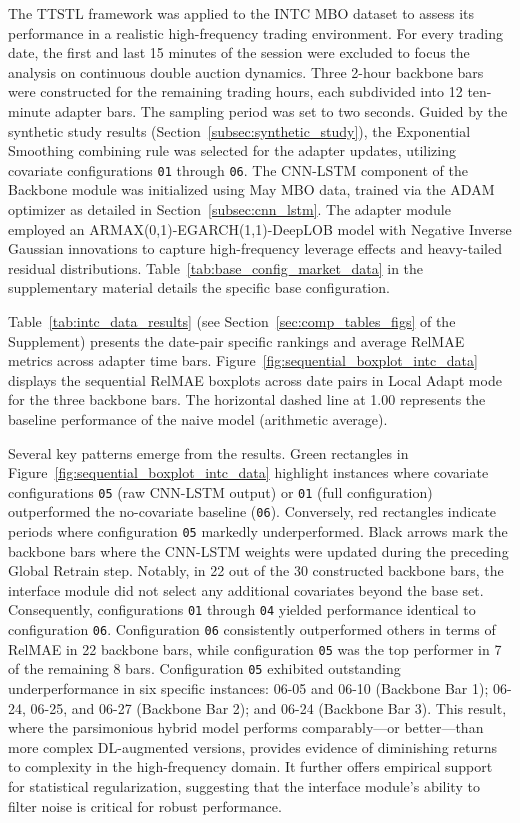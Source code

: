 \documentclass{rQUF2e}
\theoremstyle{plain}
\theoremstyle{definition}
\theoremstyle{remark}
\begin{document}
The TTSTL framework was applied to the INTC MBO dataset to assess its performance in a realistic high-frequency trading environment. For every trading date, the first and last 15 minutes of the session were excluded to focus the analysis on continuous double auction dynamics. Three 2-hour backbone bars were constructed for the remaining trading hours, each subdivided into 12 ten-minute adapter bars. The sampling period was set to two seconds. Guided by the synthetic study results (Section~\ref{subsec:synthetic_study}), the Exponential Smoothing combining rule was selected for the adapter updates, utilizing covariate configurations \texttt{01} through \texttt{06}. The CNN-LSTM component of the Backbone module was initialized using May MBO data, trained via the ADAM optimizer as detailed in Section~\ref{subsec:cnn_lstm}. The adapter module employed an ARMAX(0,1)-EGARCH(1,1)-DeepLOB model with Negative Inverse Gaussian innovations to capture high-frequency leverage effects and heavy-tailed residual distributions. Table~\ref{tab:base_config_market_data} in the supplementary material details the specific base configuration.

Table~\ref{tab:intc_data_results} (see Section~\ref{sec:comp_tables_figs} of the Supplement) presents the date-pair specific rankings and average RelMAE metrics across adapter time bars. Figure~\ref{fig:sequential_boxplot_intc_data} displays the sequential RelMAE boxplots across date pairs in Local Adapt mode for the three backbone bars. The horizontal dashed line at 1.00 represents the baseline performance of the naive model (arithmetic average).

Several key patterns emerge from the results. Green rectangles in Figure~\ref{fig:sequential_boxplot_intc_data} highlight instances where covariate configurations \texttt{05} (raw CNN-LSTM output) or \texttt{01} (full configuration) outperformed the no-covariate baseline (\texttt{06}). Conversely, red rectangles indicate periods where configuration \texttt{05} markedly underperformed. Black arrows mark the backbone bars where the CNN-LSTM weights were updated during the preceding Global Retrain step. Notably, in 22 out of the 30 constructed backbone bars, the interface module did not select any additional covariates beyond the base set. Consequently, configurations \texttt{01} through \texttt{04} yielded performance identical to configuration \texttt{06}. Configuration \texttt{06} consistently outperformed others in terms of RelMAE in 22 backbone bars, while configuration \texttt{05} was the top performer in 7 of the remaining 8 bars. Configuration \texttt{05} exhibited outstanding underperformance in six specific instances: 06-05 and 06-10 (Backbone Bar 1); 06-24, 06-25, and 06-27 (Backbone Bar 2); and 06-24 (Backbone Bar 3). This result, where the parsimonious hybrid model performs comparably—or better—than more complex DL-augmented versions, provides evidence of diminishing returns to complexity in the high-frequency domain. It further offers empirical support for statistical regularization, suggesting that the interface module's ability to filter noise is critical for robust performance.
\end{document}
